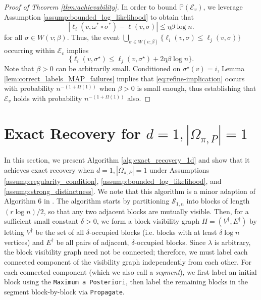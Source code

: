 \documentclass{article}
\newcommand{\1}{\mathbbm{1}}
\newcommand{\calS}{\mathcal{S}}
\theoremstyle{definition}
\theoremstyle{plain}
\begin{document}
\begin{proof}[Proof of Theorem \ref{thm:achievability}]
In order to bound $\mathbb{P}(\mathcal{E}_v)$, we leverage Assumption \ref{assump:bounded_log_likelihood} to obtain that 
\begin{equation*}
    |\ell_i(v, \omega^* \circ \sigma^*) - \ell(v, \sigma)| \leq \eta \beta \log n.
\end{equation*}
for all $\sigma \in W(v; \beta)$. Thus, the event
$\bigcup_{\sigma \in W(v; \beta)}  \{\ell_i(v, \sigma) \leq \ell_j(v, \sigma) \}$ occurring within $\mathcal{E}_v$ implies 
\begin{equation}
\{\ell_i(v,\sigma^{\star}) \leq \ell_j(v, \sigma^{\star}) + 2 \eta \beta \log n\}. \label{eq:refine-implication}
\end{equation} 
Note that $\beta > 0$ can be arbitrarily small.
Conditioned on $\sigma^{\star}(v) = i$, Lemma \ref{lem:correct_labels_MAP_failures} implies that \eqref{eq:refine-implication} occurs with probability $n^{-(1 + \Omega(1))}$ when $\beta > 0$ is small enough, thus establishing that $\mathcal{E}_v$ holds with probability $n^{-(1 + \Omega(1))}$ also.
\end{proof}



\section{Exact Recovery for $d = 1, |\Omega_{\pi, P}| = 1$}
\label{appx:1d_proof_of_exact_recovery}
In this section, we present Algorithm \ref{alg:exact_recovery_1d} and show that it achieves exact recovery when $d = 1, |\Omega_{\pi, P}| = 1$ under Assumptions \ref{assump:regularity_condition}, \ref{assump:bounded_log_likelihood}, and \ref{assump:strong_distinctness}. We note that this algorithm is a minor adaption of Algorithm 6 in \cite{Gaudio+2025}. The algorithm starts by partitioning $\calS_{1, n}$ into blocks of length $(r \log n) / 2$, so that any two adjacent blocks are mutually visible. Then, for a sufficient small constant $\delta > 0$, we form a block visibility graph $H = (V^\dagger, E^\dagger)$ by letting $V^\dagger$ be the set of all $\delta$-occupied blocks (i.e. blocks with at least $\delta \log n$ vertices) and $E^\dagger$ be all pairs of adjacent, $\delta$-occupied blocks. Since $\lambda$ is arbitrary, the block visibility graph need not be connected; therefore, we must label each connected component of the visibility graph independently from each other. For each connected component (which we also call a \textit{segment}), we first label an initial block using the \texttt{Maximum a Posteriori}, then label the remaining blocks in the segment block-by-block via \texttt{Propagate}.
\end{document}
